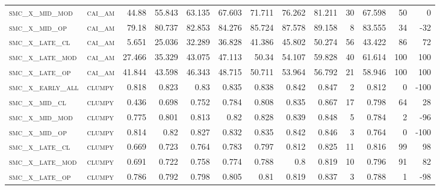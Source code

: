 \begin{landscape}
\begin{center}
\begin{footnotesize}
\begin{longtable}{llrrrrrrrr|rrr}
\textsc{smc\_x\_mid\_mod  } & \textsc{cai\_am   }   & 44.88    & 55.843   & 63.135   & 67.603   & 71.711   & 76.262   & 81.211   & 30     & 67.598        & 50            & 0               \\
\textsc{smc\_x\_mid\_op   } & \textsc{cai\_am   }   & 79.18    & 80.737   & 82.853   & 84.276   & 85.724   & 87.578   & 89.158   & 8      & 83.555        & 34            & -32             \\
\textsc{smc\_x\_late\_cl  } & \textsc{cai\_am   }   & 5.651    & 25.036   & 32.289   & 36.828   & 41.386   & 45.802   & 50.274   & 56     & 43.422        & 86            & 72              \\
\textsc{smc\_x\_late\_mod } & \textsc{cai\_am   }   & 27.466   & 35.329   & 43.075   & 47.113   & 50.34    & 54.107   & 59.828   & 40     & 61.614        & 100           & 100             \\
\textsc{smc\_x\_late\_op  } & \textsc{cai\_am   }   & 41.844   & 43.598   & 46.343   & 48.715   & 50.711   & 53.964   & 56.792   & 21     & 58.946        & 100           & 100             \\
\textsc{smc\_x\_early\_all} & \textsc{clumpy    }   & 0.818    & 0.823    & 0.83     & 0.835    & 0.838    & 0.842    & 0.847    & 2      & 0.812         & 0             & -100            \\
\textsc{smc\_x\_mid\_cl   } & \textsc{clumpy    }   & 0.436    & 0.698    & 0.752    & 0.784    & 0.808    & 0.835    & 0.867    & 17     & 0.798         & 64            & 28              \\
\textsc{smc\_x\_mid\_mod  } & \textsc{clumpy    }   & 0.775    & 0.801    & 0.813    & 0.82     & 0.828    & 0.839    & 0.848    & 5      & 0.784         & 2             & -96             \\
\textsc{smc\_x\_mid\_op   } & \textsc{clumpy    }   & 0.814    & 0.82     & 0.827    & 0.832    & 0.835    & 0.842    & 0.846    & 3      & 0.764         & 0             & -100            \\
\textsc{smc\_x\_late\_cl  } & \textsc{clumpy    }   & 0.669    & 0.723    & 0.764    & 0.783    & 0.797    & 0.812    & 0.825    & 11     & 0.816         & 99            & 98              \\
\textsc{smc\_x\_late\_mod } & \textsc{clumpy    }   & 0.691    & 0.722    & 0.758    & 0.774    & 0.788    & 0.8      & 0.819    & 10     & 0.796         & 91            & 82              \\
\textsc{smc\_x\_late\_op  } & \textsc{clumpy    }   & 0.786    & 0.792    & 0.798    & 0.805    & 0.81     & 0.819    & 0.837    & 3      & 0.788         & 1             & -98             \\

\end{longtable}
\end{footnotesize}
\end{center}
\end{landscape}
